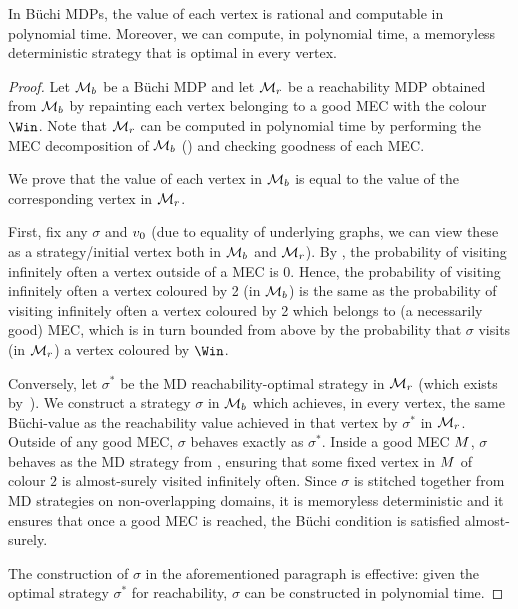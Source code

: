 \begin{theorem}
\label{5-thm:quant-buchi}
In B\"uchi MDPs, the value of each vertex is rational and computable in polynomial time. Moreover, we can compute, in polynomial time, a memoryless deterministic strategy that is optimal in every vertex.
\end{theorem}
\begin{proof}
Let $\mathcal{M}_b$ be a B\"uchi MDP and let $\mathcal{M}_r$ be a reachability MDP obtained from $\mathcal{M}_b$ by repainting each vertex belonging to a good MEC with the colour $\Win$. Note that $\mathcal{M}_r$ can be computed in polynomial time by performing the MEC decomposition of $\mathcal{M}_b$ () and checking goodness of each MEC.

We prove that the value of each vertex in $\mathcal{M}_b$ is equal to the value of the corresponding vertex in $\mathcal{M}_r$.

First, fix any $\sigma$ and $v_0$ (due to equality of underlying graphs, we can view these as a strategy/initial vertex both in $\mathcal{M}_b$ and $\mathcal{M}_r$). By , the probability of visiting infinitely often a vertex outside of a MEC is 0. Hence, the probability of visiting infinitely often a vertex coloured by 2 (in $\mathcal{M}_b$) is the same as the probability of visiting infinitely often a vertex coloured by 2 which belongs to (a necessarily good) MEC, which is in turn bounded from above by the probability that $\sigma$ visits (in $\mathcal{M}_r$) a vertex coloured by $\Win$.

Conversely, let $\sigma^*$ be the MD reachability-optimal strategy in $\mathcal{M}_r$ (which exists by~). We construct a strategy $\sigma$ in $\mathcal{M}_b$ which achieves, in every vertex, the same B\"uchi-value as the reachability value achieved in that vertex by $\sigma^*$ in $\mathcal{M}_r$. Outside of any good MEC, $\sigma$ behaves exactly as $\sigma^*$. Inside a good MEC $M$, $\sigma$ behaves as the MD strategy from , ensuring that some fixed vertex in $M$ of colour $2$ is almost-surely visited infinitely often. Since $\sigma$ is stitched together from MD strategies on non-overlapping domains, it is memoryless deterministic and it ensures that once a good MEC is reached, the B\"uchi condition is satisfied almost-surely.

The construction of $\sigma$ in the aforementioned paragraph is effective: given the optimal strategy $\sigma^*$ for reachability, $\sigma$ can be constructed in polynomial time.
\end{proof}

